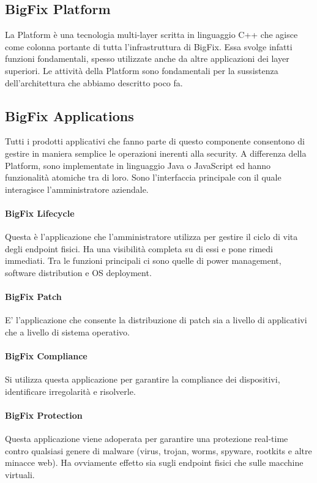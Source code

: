 \subsection{BigFix Platform}
La Platform è una tecnologia multi-layer scritta in linguaggio C++ che agisce come colonna portante di tutta l'infrastruttura di BigFix. Essa svolge infatti funzioni fondamentali, spesso utilizzate anche da altre applicazioni dei layer superiori. Le attività della Platform sono fondamentali per la sussistenza dell'architettura che abbiamo descritto poco fa.

\subsection{BigFix Applications}
Tutti i prodotti applicativi che fanno parte di questo componente consentono di gestire in maniera semplice le operazioni inerenti alla security. A differenza della Platform, sono implementate in linguaggio Java o JavaScript ed hanno funzionalità atomiche tra di loro. Sono l'interfaccia principale con il quale interagisce l'amministratore aziendale.

\paragraph{BigFix Lifecycle}
Questa è l'applicazione che l'amministratore utilizza per gestire il ciclo di vita degli endpoint fisici. Ha una visibilità completa su di essi e pone rimedi immediati. Tra le funzioni principali ci sono quelle di power management, software distribution e OS deployment. 
\paragraph{BigFix Patch}
E' l'applicazione che consente la distribuzione di patch sia a livello di applicativi che a livello di sistema operativo.
\paragraph{BigFix Compliance}
Si utilizza questa applicazione per garantire la compliance dei dispositivi, identificare irregolarità e risolverle.
\paragraph{BigFix Protection}
Questa applicazione viene adoperata per garantire una protezione real-time contro qualsiasi genere di malware (virus, trojan, worms, spyware, rootkits e altre minacce web). Ha ovviamente effetto sia sugli endpoint fisici che sulle macchine virtuali.
